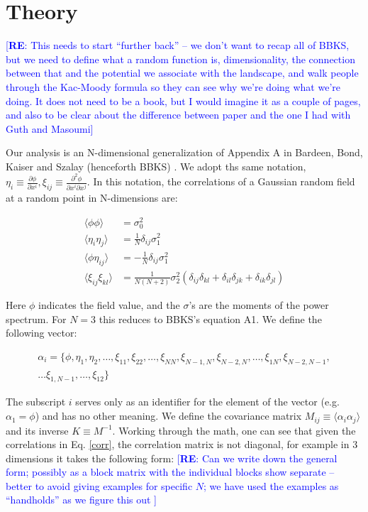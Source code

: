 \documentclass[12pt]{article}
\newcommand{\re}[1]{\textcolor{blue}{[{\bf RE}: #1]}}
\begin{document}
\section{Theory}

\re{This needs to start ``further back'' -- we don't want to recap all of BBKS, but we need to define what a random function is, dimensionality, the connection between that  and the potential we associate with the landscape, and walk people through the Kac-Moody formula so they can see why we're doing what we're doing. It does not need to be a book, but I would imagine it as a couple of pages, and also to be clear about the difference between paper and the one I had with Guth and Masoumi}

Our analysis is an N-dimensional generalization of Appendix A in Bardeen, Bond, Kaiser and Szalay (henceforth BBKS) \cite{BBKS}. We adopt ths same notation, $\eta_i \equiv \frac{\partial \phi}{\partial x^i}, \xi_{ij} \equiv \frac{\partial^2 \phi}{\partial x^i \partial x^j}$. In this notation, the correlations of a Gaussian random field at a random point in N-dimensions are:

\begin{equation} \label{corr}
\begin{split}
\langle\phi\phi\rangle &= \sigma_0^2 \\
\langle\eta_i\eta_j\rangle &= \frac{1}{N}\delta_{ij}\sigma_1^2 \\
\langle\phi\eta_{ij}\rangle &= -\frac{1}{N}\delta_{ij}\sigma_1^2 \\
\langle\xi_{ij}\xi_{kl}\rangle &= \frac{1}{N(N+2)}\sigma_2^2(\delta_{ij}\delta_{kl}+\delta_{il}\delta_{jk}+\delta_{ik}\delta_{jl})
\end{split}
\end{equation}

\noindent Here $\phi$ indicates the field value, and the $\sigma$'s are the moments of the power spectrum. For $N=3$ this reduces to BBKS's equation A1. We define the following vector:

\begin{equation}
\begin{split}
\alpha_i = \{\phi,\eta_1,\eta_2,\ldots,\xi_{11},\xi_{22},\ldots,\xi_{NN},\xi_{N-1,N},\xi_{N-2,N},\ldots,\xi_{1N},\xi_{N-2,N-1},\\
\ldots\xi_{1,N-1},\ldots,\xi_{12}\}
\end{split}
\end{equation}

\noindent The subscript $i$ serves only as an identifier for the element of the vector (e.g. $\alpha_1 = \phi$) and has no other meaning. We define the covariance matrix $M_{ij}\equiv\langle\alpha_i\alpha_j\rangle$ and its inverse $K \equiv M^{-1}$. Working through the math, one can see that given the correlations in Eq. \ref{corr}, the correlation matrix is not diagonal, for example in 3 dimensions it takes the following form: \re{Can we write down the general form; possibly as a block matrix with the individual blocks show separate -- better to avoid giving examples for specific $N$; we have used the examples as ``handholds'' as we figure this out }
\end{document}
